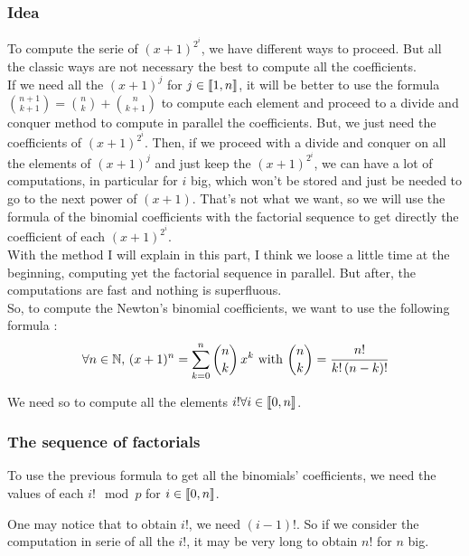 
\subsubsection{Idea}

To compute the serie of $(x+1)^{2^i}$, we have different ways to proceed. But all the classic ways are not necessary the best to compute all the coefficients. \\

If we need all the $(x+1)^j$ for $j \in \mbox{\textlbrackdbl} 1, n\mbox{\textrbrackdbl}$, it will be better to use the formula ${n+1 \choose k+1} = {n \choose k} + {n \choose k+1}$ to compute each element and proceed to a divide and conquer method to compute in parallel the coefficients. But, we just need the coefficients of $(x+1)^{2^i}$. Then, if we proceed with a divide and conquer on all the elements of $(x+1)^j$ and just keep the $(x+1)^{2^i}$, we can have a lot of computations, in particular for $i$ big, which won't be stored and just be needed to go to the next power of $(x+1)$. That's not what we want, so we will use the formula of the binomial coefficients with the factorial sequence to get directly the coefficient of each $(x+1)^{2^i}$. \\

With the method I will explain in this part, I think we loose a little time at the beginning, computing yet the factorial sequence in parallel. But after, the computations are fast and nothing is superfluous.\\

So, to compute the Newton's binomial coefficients, we want to use the following formula :
$$\forall n\in \mathbb{N},\, (x+1)^n = \sum_{k=0}^{n} {n \choose k}\, x^k \mbox{ with } {n \choose k} = \cfrac{n!}{k!\, (n-k)!}$$

We need so to compute all the elements $i! \forall i\in \mbox{\textlbrackdbl} 0, n\mbox{\textrbrackdbl}$.

\subsubsection{The sequence of factorials}

To use the previous formula to get all the binomials' coefficients, we need the values of each $i! \mod p$ for $i \in \mbox{\textlbrackdbl} 0, n\mbox{\textrbrackdbl}$.

One may notice that to obtain $i!$, we need $(i-1)!$. So if we consider the computation in serie of all the $i!$, it may be very long to obtain $n!$ for $n$ big. \\

